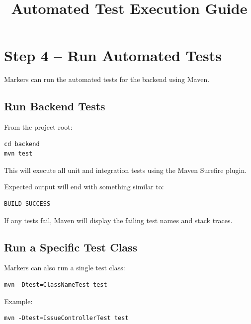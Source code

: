\documentclass[12pt]{article}
\title{Automated Test Execution Guide}
\author{}
\date{}
\begin{document}
\maketitle

\section{Step 4 – Run Automated Tests}

Markers can run the automated tests for the backend using Maven.

\subsection{Run Backend Tests}

From the project root:

\begin{lstlisting}
cd backend
mvn test
\end{lstlisting}

This will execute all unit and integration tests using the Maven Surefire plugin.

Expected output will end with something similar to:

\begin{lstlisting}
BUILD SUCCESS
\end{lstlisting}

If any tests fail, Maven will display the failing test names and stack traces.

\subsection{Run a Specific Test Class}

Markers can also run a single test class:

\begin{lstlisting}
mvn -Dtest=ClassNameTest test
\end{lstlisting}

Example:

\begin{lstlisting}
mvn -Dtest=IssueControllerTest test
\end{lstlisting}
\end{document}
